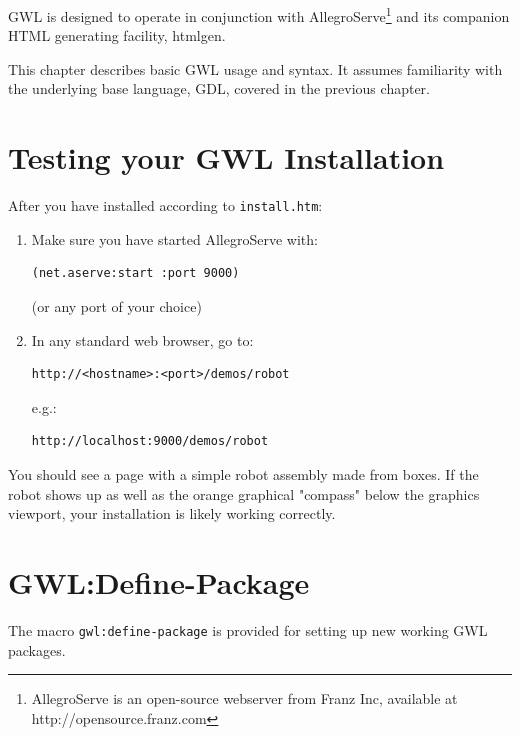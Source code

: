 \documentclass [11pt]{book}
\begin{document}
GWL is designed to operate in conjunction with AllegroServe\footnote{AllegroServe is an open-source webserver from Franz Inc, available
at http://opensource.franz.com} and its companion HTML generating facility, htmlgen. 

This chapter describes basic GWL usage and syntax. It assumes familiarity with the
underlying base language, GDL, covered in the previous chapter.

\section{Testing your GWL Installation}

\label{sec:testingyourgwlinstallation}

After you have installed according to \texttt{install.htm}:

\begin{enumerate}

\item Make sure you have started AllegroServe with:

\begin{verbatim}(net.aserve:start :port 9000)
\end{verbatim}(or any port of your choice)

\item In any standard web browser, go to:

\begin{verbatim}http://<hostname>:<port>/demos/robot
\end{verbatim}e.g.: 

\begin{verbatim}http://localhost:9000/demos/robot
\end{verbatim}

\end{enumerate}

You should see a page with a simple robot assembly made from boxes. If 
the robot shows up as well as the orange graphical "compass" below the 
graphics viewport, your installation is likely working correctly.

\section{GWL:Define-Package}

\label{sec:gwl:define-package}

The macro \texttt{gwl:define-package} is provided for setting up new working GWL packages.
\end{document}
